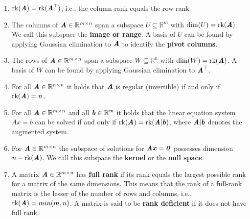 \begin{enumerate}
    \item $\text{rk}(\text{\textbf{\textit{A}}}) = \text{rk}(\text{\textbf{\textit{A}}}^\top)$, i.e., the column rank equals the row rank.
    \hfill \cite{mfml/book/mml/Deisenroth-Faisal-Ong}

    \item The columns of $\text{\textbf{\textit{A}}} \in \mathbb{R}^{m\times n}$ span a subspace $U \subseteq \mathbb{R}^m$ with $\dim(U) = \text{rk}(\text{\textbf{\textit{A}}})$. 
    We call this subspace the \textbf{image or range}. 
    A basis of $U$ can be found by applying Gaussian elimination to $\text{\textbf{\textit{A}}}$ to identify the \textbf{pivot columns}.
    \hfill \cite{mfml/book/mml/Deisenroth-Faisal-Ong}

    \item The rows of $\text{\textbf{\textit{A}}} \in  \mathbb{R}^{m\times n}$  span a subspace $W \subseteq \mathbb{R}^n$ with $\dim(W) = \text{rk}(\text{\textbf{\textit{A}}})$. 
    A basis of $W$ can be found by applying Gaussian elimination to $\text{\textbf{\textit{A}}}^\top$.
    \hfill \cite{mfml/book/mml/Deisenroth-Faisal-Ong}

    \item For all $\text{\textbf{\textit{A}}} \in  \mathbb{R}^{n\times n}$ it holds that $\text{\textbf{\textit{A}}}$ is regular (invertible) if and only if $\text{rk}(\text{\textbf{\textit{A}}}) = n$.
    \hfill \cite{mfml/book/mml/Deisenroth-Faisal-Ong}

    \item For all $\text{\textbf{\textit{A}}} \in  \mathbb{R}^{m\times n}$  and all $\text{\textbf{\textit{b}}} \in  \mathbb{R}^m$ it holds that the linear equation system $Ax = b$ can be solved if and only if $\text{rk}(\text{\textbf{\textit{A}}}) = \text{rk}(\text{\textbf{\textit{A}}}|\text{\textbf{\textit{b}}})$, where $\text{\textbf{\textit{A}}}|\text{\textbf{\textit{b}}}$ denotes the augmented system.
    \hfill \cite{mfml/book/mml/Deisenroth-Faisal-Ong}

    \item For $\text{\textbf{\textit{A}}} \in  \mathbb{R}^{m\times n}$  the subspace of solutions for $\text{\textbf{\textit{A}}}\text{\textbf{\textit{x}}} = \text{\textbf{\textit{0}}}$ possesses dimension $n - \text{rk}(\text{\textbf{\textit{A}}})$. 
    We call this subspace the \textbf{kernel} or the \textbf{null space}.
    \hfill \cite{mfml/book/mml/Deisenroth-Faisal-Ong}

    \item A matrix $\text{\textbf{\textit{A}}} \in  \mathbb{R}^{m\times n}$  has \textbf{full rank} if its rank equals the largest possible rank for a matrix of the same dimensions. 
    This means that the rank of a full-rank matrix is the lesser of the number of rows and columns, i.e., $\text{rk}(\text{\textbf{\textit{A}}}) = min(m, n)$. 
    A matrix is said to be \textbf{rank deficient} if it does not have full rank.
    \hfill \cite{mfml/book/mml/Deisenroth-Faisal-Ong}

    
\end{enumerate}




